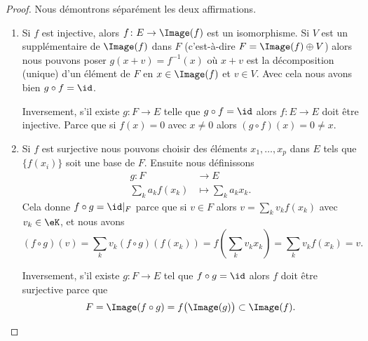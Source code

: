\begin{proof}
    Nous démontrons séparément les deux affirmations.
    \begin{enumerate}
        \item
            Si \( f\) est injective, alors \( f\colon E\to \Image(f)\) est un isomorphisme. Si $V$ est un supplémentaire de \( \Image(f)\) dans \( F\) (c'est-à-dire \( F=\Image(f)\oplus V\)) alors nous pouvons poser \( g(x+v)=f^{-1}(x)\) où \( x+v\) est la décomposition (unique) d'un élément de \( F\) en \( x\in\Image(f)\) et \( v\in V\). Avec cela nous avons bien \( g\circ f=\id\).

            Inversement, s'il existe \( g\colon F\to E\) telle que \( g\circ f=\id\) alors \( f\colon E\to E\) doit être injective. Parce que si \( f(x)=0\) avec \( x\neq 0\) alors \( (g\circ f)(x)=0\neq x\).
        \item
            Si \( f\) est surjective nous pouvons choisir des éléments \( x_1,\ldots, x_p\) dans \( E\) tels que \( \{ f(x_i) \}\) soit une base de \( F\). Ensuite nous définissons
            \begin{equation}
                \begin{aligned}
                    g\colon F&\to E \\
                    \sum_k a_k f(x_k)&\mapsto \sum_k a_k x_k.
                \end{aligned}
            \end{equation}
            Cela donne \(  f\circ g=\id|_F\) parce que si \( v\in F\) alors \( v=\sum_kv_kf(x_k)\) avec \( v_k\in \eK\), et nous avons
            \begin{equation}
                (f\circ g)(v)=\sum_k v_k (f\circ g) \left(f(x_k)\right)
                             =f\left( \sum_k v_k x_k \right)
                             =\sum_k v_k f(x_k) = v.
            \end{equation}

            Inversement, s'il existe \( g\colon F\to E\) tel que \( f\circ g=\id\) alors \( f\) doit être surjective parce que
            \begin{equation}
                F=\Image(f\circ g)=f\big( \Image(g) \big)\subset \Image(f).
            \end{equation}
    \end{enumerate}
\end{proof}

